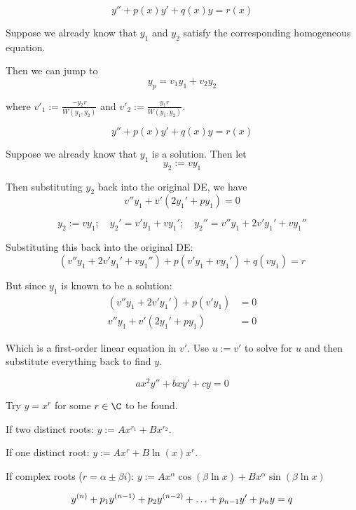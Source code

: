 $$y''+p(x)y'+q(x)y=r(x)$$

Suppose we already know that $y_1$ and $y_2$ satisfy the corresponding
homogeneous equation.

Then we can jump to
$$y_p=v_1y_1+v_2y_2$$

where $\displaystyle v'_1:=\frac{-y_2r}{W(y_1,y_2)}$ and $\displaystyle
v'_2:=\frac{y_1r}{W(y_1,y_2)}$.

\label{d359b97}

$$y''+p(x)y'+q(x)y=r(x)$$

Suppose we already know that $y_1$ is a solution. Then let
$$y_2:=vy_1$$

Then substituting $y_2$ back into the original DE, we have
$$v''y_1+v'(2y_1'+py_1)=0$$

\begin{compute}
  $$y_2:=vy_1;\quad y_2'=v'y_1+vy_1';\quad y_2''=v''y_1+2v'y_1'+vy_1''$$

  Substituting this back into the original DE:
  $$(v''y_1+2v'y_1'+vy_1'')+p(v'y_1+vy_1')+q(vy_1)=r$$

  But since $y_1$ is known to be a solution:
  \begin{align*}
    (v''y_1+2v'y_1')+p(v'y_1) &=0 \\
    v''y_1+v'(2y_1'+py_1)     &=0
  \end{align*}
\end{compute}

Which is a first-order linear equation in $v'$. Use $u:=v'$ to solve for $u$
and then substitute everything back to find $y$.

\label{c15a777}

$$ax^2y''+bxy'+cy=0$$

Try $y=x^r$ for some $r\in\C$ to be found.

If two distinct roots: $y:=Ax^{r_1}+Bx^{r_2}$.

If one distinct root: $y:=Ax^r+B\ln(x)x^r$.

If complex roots ($r=\alpha\pm\beta i$): $y:=Ax^\alpha\cos(\beta\ln
x)+Bx^\alpha\sin(\beta\ln x)$



\begin{equation*}\def\y#1{y^{(#1)}}
  \y n+p_1\y{n-1}+p_2\y{n-2}+\ldots+p_{n-1}y'+p_ n y=q
\end{equation*}

